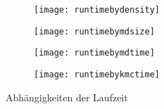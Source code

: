 \begin{figure}[p]
  
  \captionsetup[subfigure]{singlelinecheck=false}
  \def\subfigwidth{7cm}
  \begin{subfigure}[t]{\subfigwidth}
    \texttt{[image: runtimebydensity]}
  \end{subfigure}
  \hfill
  \begin{subfigure}[t]{\subfigwidth}
    \texttt{[image: runtimebymdsize]}
  \end{subfigure}

  \begin{subfigure}[t]{\subfigwidth}
    \texttt{[image: runtimebymdtime]}
  \end{subfigure}
  \hfill
  \begin{subfigure}[t]{\subfigwidth}
    \texttt{[image: runtimebykmctime]}
  \end{subfigure}
  \hfill

  \caption{Abhängigkeiten der Laufzeit}
  
\end{figure}
